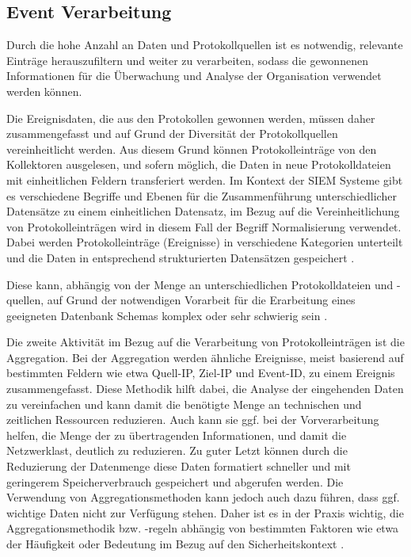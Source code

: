 \subsection{Event Verarbeitung}
\label{cha:Event Verarbeitung}
Durch die hohe Anzahl an Daten und Protokollquellen ist es notwendig, relevante Einträge herauszufiltern und weiter zu verarbeiten, sodass die gewonnenen Informationen für die Überwachung und Analyse der Organisation verwendet werden können.

Die Ereignisdaten, die aus den Protokollen gewonnen werden, müssen daher zusammengefasst und auf Grund der Diversität der Protokollquellen vereinheitlicht werden. Aus diesem Grund können Protokolleinträge von den Kollektoren ausgelesen, und sofern möglich, die Daten in neue Protokolldateien mit einheitlichen Feldern transferiert werden. Im Kontext der SIEM Systeme gibt es verschiedene Begriffe und Ebenen für die Zusammenführung unterschiedlicher Datensätze zu einem einheitlichen Datensatz, im Bezug auf die Vereinheitlichung von Protokolleinträgen wird in diesem Fall der Begriff \glqq Normalisierung\grqq{} verwendet. Dabei werden Protokolleinträge (Ereignisse) in verschiedene Kategorien unterteilt und die Daten in entsprechend strukturierten Datensätzen gespeichert \citep{EP1}.

Diese kann, abhängig von der Menge an unterschiedlichen Protokolldateien und -quellen, auf Grund der notwendigen Vorarbeit für die Erarbeitung eines geeigneten Datenbank Schemas komplex oder sehr schwierig sein \citep{EP2}.

Die zweite Aktivität im Bezug auf die Verarbeitung von Protokolleinträgen ist die Aggregation. Bei der Aggregation werden ähnliche Ereignisse, meist basierend auf bestimmten Feldern wie etwa Quell-IP, Ziel-IP und Event-ID, zu einem Ereignis zusammengefasst. Diese Methodik hilft dabei, die Analyse der eingehenden Daten zu vereinfachen und kann damit die benötigte Menge an technischen und zeitlichen Ressourcen reduzieren. Auch kann sie ggf. bei der Vorverarbeitung helfen, die Menge der zu übertragenden Informationen, und damit die Netzwerklast, deutlich zu reduzieren. Zu guter Letzt können durch die Reduzierung der Datenmenge diese Daten formatiert schneller und mit geringerem Speicherverbrauch gespeichert und abgerufen werden.
Die Verwendung von Aggregationsmethoden kann jedoch auch dazu führen, dass ggf. wichtige Daten nicht zur Verfügung stehen. Daher ist es in der Praxis wichtig, die Aggregationsmethodik bzw. -regeln abhängig von bestimmten Faktoren wie etwa der Häufigkeit oder Bedeutung im Bezug auf den Sicherheitskontext \citep{EP3}.

